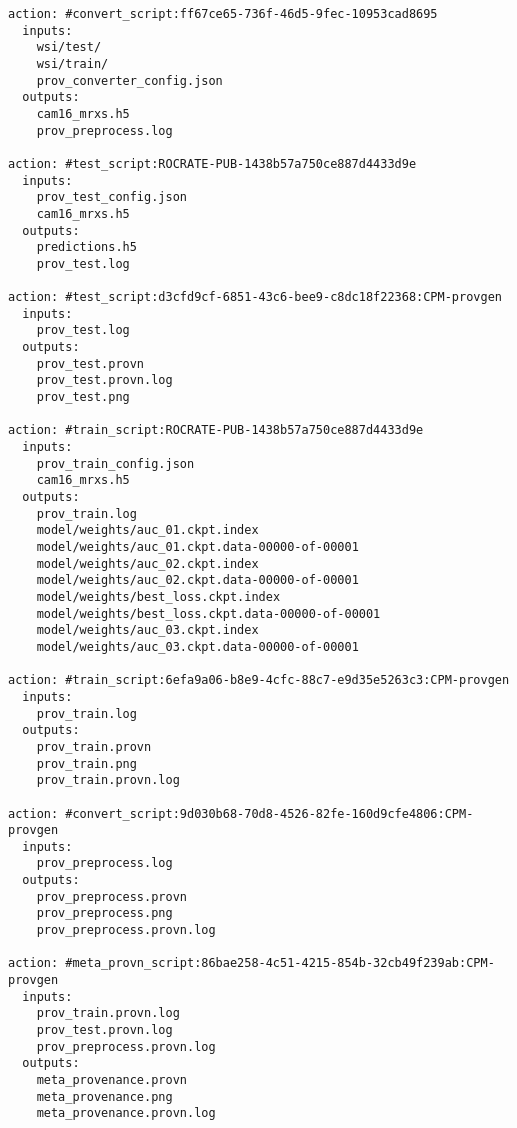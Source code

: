 \begin{lstlisting}[float,basicstyle=\scriptsize\ttfamily,caption={Excerpt of the output of the \texttt{runcrate report} command for the AI model training Process Run Crate; only inputs and outputs of the actions are shown. The listing shows the connections between the pipeline actions through the entities they produce or consume -- e.g., \texttt{cam16\_mrxs.h5} is output of the conversion script \texttt{convert\_script:ff67\ldots} and input for the training script \texttt{train\_script:ROCRATE\ldots}},label={lst:wrroc:model_training_pipeline_report}]
action: #convert_script:ff67ce65-736f-46d5-9fec-10953cad8695
  inputs:
    wsi/test/
    wsi/train/
    prov_converter_config.json
  outputs:
    cam16_mrxs.h5
    prov_preprocess.log

action: #test_script:ROCRATE-PUB-1438b57a750ce887d4433d9e
  inputs:
    prov_test_config.json
    cam16_mrxs.h5
  outputs:
    predictions.h5
    prov_test.log

action: #test_script:d3cfd9cf-6851-43c6-bee9-c8dc18f22368:CPM-provgen
  inputs:
    prov_test.log
  outputs:
    prov_test.provn
    prov_test.provn.log
    prov_test.png

action: #train_script:ROCRATE-PUB-1438b57a750ce887d4433d9e
  inputs:
    prov_train_config.json
    cam16_mrxs.h5
  outputs:
    prov_train.log
    model/weights/auc_01.ckpt.index
    model/weights/auc_01.ckpt.data-00000-of-00001
    model/weights/auc_02.ckpt.index
    model/weights/auc_02.ckpt.data-00000-of-00001
    model/weights/best_loss.ckpt.index
    model/weights/best_loss.ckpt.data-00000-of-00001
    model/weights/auc_03.ckpt.index
    model/weights/auc_03.ckpt.data-00000-of-00001

action: #train_script:6efa9a06-b8e9-4cfc-88c7-e9d35e5263c3:CPM-provgen
  inputs:
    prov_train.log
  outputs:
    prov_train.provn
    prov_train.png
    prov_train.provn.log

action: #convert_script:9d030b68-70d8-4526-82fe-160d9cfe4806:CPM-provgen
  inputs:
    prov_preprocess.log
  outputs:
    prov_preprocess.provn
    prov_preprocess.png
    prov_preprocess.provn.log

action: #meta_provn_script:86bae258-4c51-4215-854b-32cb49f239ab:CPM-provgen
  inputs:
    prov_train.provn.log
    prov_test.provn.log
    prov_preprocess.provn.log
  outputs:
    meta_provenance.provn
    meta_provenance.png
    meta_provenance.provn.log
\end{lstlisting}


